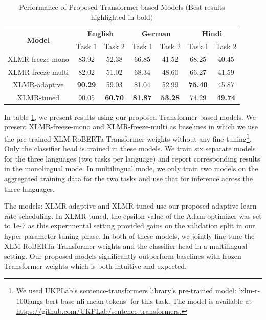 \documentclass[
]{ceurart}
\begin{document}
\begin{table}[]
\centering
\begin{tabular*}{\textwidth}{c@{\extracolsep{\fill}} cccccc}
\toprule
\multirow{2}{*}{\textbf{Model}} & \multicolumn{2}{c}{\textbf{English}} & \multicolumn{2}{c}{\textbf{German}} & \multicolumn{2}{c}{\textbf{Hindi}} \\ \cmidrule{2-3} \cmidrule{4-5} \cmidrule{6-7}
 & Task 1 & Task 2 & Task 1 & Task 2 & Task 1 & Task 2 \\ \midrule
XLMR-freeze-mono & 83.92 & 52.38 & 66.85 & 41.52 & 68.25 & 40.45 \\ %
XLMR-freeze-multi & 82.02 & 51.02 & 68.34 & 48.60 & 66.27 & 41.59 \\ \midrule
XLMR-adaptive & \textbf{90.29} & 59.03 & 81.04 & 52.99 & \textbf{75.40} & 45.87 \\ %
XLMR-tuned & 90.05 & \textbf{60.70} & \textbf{81.87} & \textbf{53.28} & 74.29 & \textbf{49.74} \\ 
\end{tabular*}
\caption{Performance of Proposed Transformer-based Models $($Best results highlighted in bold$)$}
\label{tab:transformers}
\end{table}

In table \ref{tab:transformers}, we present results using our proposed Transformer-based models. We present XLMR-freeze-mono and XLMR-freeze-multi as baselines in which we use the pre-trained XLM-RoBERTa Transformer weights without any fine-tuning\footnote{We used UKPLab's sentence-transformers library's pre-trained model: `xlm-r-100langs-bert-base-nli-mean-tokens' for this task. The model is available at \url{https://github.com/UKPLab/sentence-transformers.}}. Only the classifier head is trained in these models. We train six separate models for the three languages (two tasks per language) and report corresponding results in the monolingual mode. In multilingual mode, we only train two models on the aggregated training data for the two tasks and use that for inference across the three languages.

The models: XLMR-adaptive and XLMR-tuned use our proposed adaptive learn rate scheduling. In XLMR-tuned, the epsilon value of the Adam optimizer was set to 1e-7 as this experimental setting provided gains on the validation split in our hyper-parameter tuning phase. In both of these models, we jointly fine-tune the XLM-RoBERTa Transformer weights and the classifier head in a multilingual setting. Our proposed models significantly outperform baselines with frozen Transformer weights which is both intuitive and expected.
\end{document}
